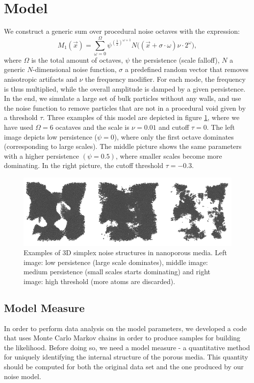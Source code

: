 \documentclass[aps,pre,twocolumn,letterpaper,floatfix,showpacs]{revtex4}
\begin{document}
\section{Model}
We construct a generic sum over procedural noise octaves with the expression: 
\begin{equation}
  M_1(\vec x) = \sum_{\omega=0}^{\Omega} \psi^{(\frac{1}{2})^{\omega +1}}   N\big((\vec x + \sigma \cdot \omega)\nu \cdot 2^\omega \big),
\label{eq:noisemodel1}
\end{equation}
where $\Omega$ is the total amount of octaves, $\psi$ the persistence (scale falloff), $N$ a generic $N$-dimensional noise function, $\sigma$ a predefined random vector that removes anisotropic artifacts and $\nu$ the frequency modifier. For each mode, the frequency is thus multiplied, while the overall amplitude is damped by a given persistence. In the end, we simulate a large set of bulk particles without any walls, and use the noise function to remove particles that are not in a procedural void given by a threshold $\tau$. Three examples of this model are depicted in figure \ref{fig:model_example}, where we have used $\Omega=6$ ocataves and the scale is $\nu=0.01$ and cutoff $\tau=0$. The left image depicts low persistence ($\psi = 0$), where only the first octave dominates (corresponding to large scales). The middle picture shows the same parameters with a higher persistence $(\psi = 0.5)$, where smaller scales become more dominating. In the right picture, the cutoff threshold $\tau = -0.3$.   

\begin{figure}
\includegraphics[width=.95\textwidth]{model_examples.png}
\caption{Examples of 3D simplex noise structures in nanoporous media. Left image: low persistence (large scale dominates), middle image: medium persistence (small scales starts dominating) and right image: high threshold (more atoms are discarded). }
\label{fig:model_example}
\end{figure}



\subsection{Model Measure}
In order to perform data analysis on the model parameters, we developed a code that uses Monte Carlo Markov chains in order to produce samples for building the likelihood. Before doing so, we need a model measure - a quantitative method for uniquely identifying the internal structure of the porous media. This quantity should be computed for both the original data set and the one produced by our noise model. 
\end{document}
